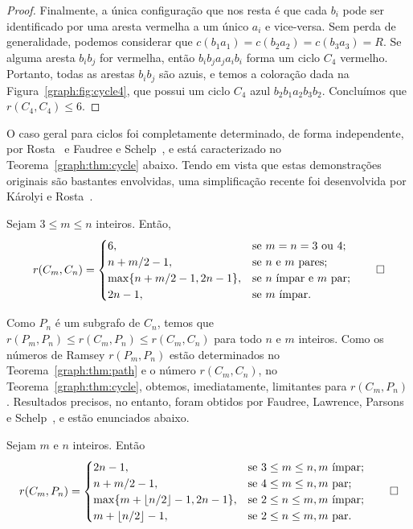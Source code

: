 \begin{proof}
Finalmente, a única configuração que nos resta é que cada $b_i$ pode ser identificado por uma aresta vermelha a um único $a_i$ e vice-versa. Sem perda de generalidade, podemos considerar que $c(b_1 a_1) = c(b_2 a_2) = c(b_3 a_3) = R$. Se alguma aresta $b_i b_j$ for vermelha, então $b_i b_j a_j a_i b_i$ forma um ciclo $C_4$ vermelho. Portanto, todas as arestas $b_i b_j$ são azuis, e temos a coloração dada na Figura~\ref{graph:fig:cycle4}, que possui um ciclo $C_4$ azul $b_2 b_1 a_2 b_3 b_2$. Concluímos que $r(C_4,C_4) \leq 6$.
\end{proof}

O caso geral para ciclos foi completamente determinado, de forma independente, por Rosta~\cite{rosta1973ramsey} e Faudree e Schelp~\cite{faudree1974all}, e está caracterizado no Teorema~\ref{graph:thm:cycle} abaixo. Tendo em vista que estas demonstrações originais são bastantes envolvidas, uma simplificação recente foi desenvolvida por Károlyi e Rosta~\cite{karolyi2001generalized}.

\begin{noprooftheorem}
\label{graph:thm:cycle}
Sejam $3 \leq m \leq n$ inteiros. Então,
\[r(C_m, C_n) = \begin{cases}
  6, & \text{se }m = n = 3 \text{ ou } 4;\\
  n + m/2 - 1, & \text{se }  n \text{ e } m \text{ pares}; \\
  \max\{n + m/2 - 1, 2n - 1\}, & \text{se } n \text{ ímpar e } m \text{ par};\\
  2n - 1 , & \text{se } m \text{ ímpar}.
\end{cases} \qedhere \]
\end{noprooftheorem}

Como $P_n$ é um subgrafo de $C_n$, temos que $r(P_m, P_n) \leq r(C_m, P_n) \leq r(C_m, C_n)$ para todo $n$ e $m$ inteiros. Como os números de Ramsey $r(P_m, P_n)$ estão determinados no Teorema~\ref{graph:thm:path} e o número $r(C_m, C_n)$, no Teorema~\ref{graph:thm:cycle}, obtemos, imediatamente, limitantes para $r(C_m, P_n)$. Resultados precisos, no entanto, foram obtidos por Faudree, Lawrence, Parsons e Schelp~\cite{faudree1974path}, e estão enunciados abaixo.

\begin{noprooftheorem}
\label{graph:thm:pathcycle}
Sejam $m$ e $n$ inteiros. Então
\[r(C_m, P_n) = \begin{cases}
  2n - 1, & \text{se }3 \leq m \leq n, m \text{ ímpar};\\
  n + m/2 - 1, & \text{se }4 \leq m \leq n, m \text{ par}; \\
  \max\{m + \lfloor n/2 \rfloor - 1, 2n - 1\}, & \text{se } 2 \leq n \leq m, m \text{ ímpar};\\
  m + \lfloor n/2 \rfloor -1 , & \text{se } 2 \leq n \leq m, m \text{ par}.
\end{cases} \qedhere\]
\end{noprooftheorem}


